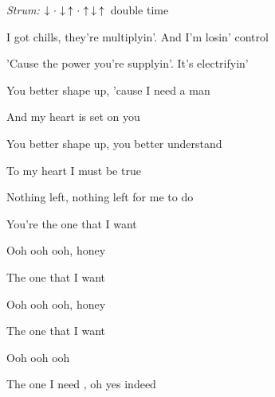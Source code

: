 \begin{song}


\begin{headerbox}
 \quad
\textit{Strum:} $\Down\Miss\Down\Up\Miss\Up\Down\Up$ double time
\end{headerbox}

\begin{hchordbox}
\end{hchordbox}

\Large

\bigskip

I got chills, they're multiplyin'. And I'm losin' control \par
'Cause the power you're supplyin'. It's electrifyin' \par

\bigskip

You better shape up, 'cause I need a man \par
{} And my heart is set on you \par
You better shape up, you better understand \par
{} To my heart I must be true \par
Nothing left, nothing left for me to do \par

\bigskip

\begin{chorusbox}{\Chorus}
You're the one that I want  \par
{} Ooh ooh ooh, honey \par
The one that I want  \par
{} Ooh ooh ooh, honey \par
The one that I want  \par
{} Ooh ooh ooh \par
The one I need , oh yes indeed \par
\end{chorusbox}

\bigskip


\end{song}
